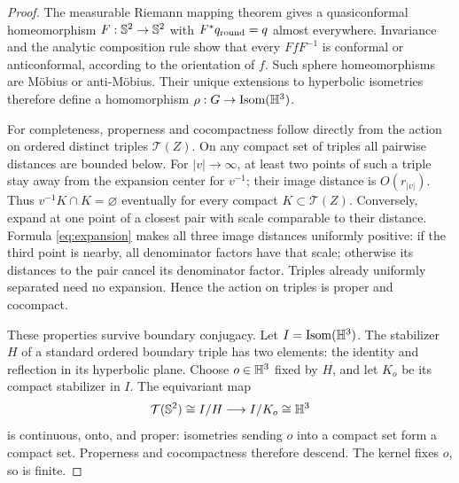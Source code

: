 \begin{proof}
The measurable Riemann mapping theorem
\cite[Theorem 6]{AhlforsBers} gives a quasiconformal
homeomorphism $F:\mathbb S^2\to\mathbb S^2$ with $F^*q_{\rm round}=q$ almost
everywhere. Invariance and the analytic composition rule show that
every $FfF^{-1}$ is conformal or anticonformal, according to the
orientation of $f$. Such sphere homeomorphisms are M\"obius or
anti-M\"obius. Their unique extensions to hyperbolic isometries therefore
define a homomorphism $\rho:G\to\operatorname{Isom}(\mathbb H^3)$.

For completeness, properness and cocompactness follow directly
from the action on ordered distinct triples $\mathcal T(Z)$.
On any compact set of triples all pairwise distances are bounded
below. For $|v|\to\infty$, at least two points of such a triple
stay away from the expansion center for $v^{-1}$; their image
distance is $O(r_{|v|})$. Thus $v^{-1}K\cap K=\varnothing$
eventually for every compact $K\subset\mathcal T(Z)$.
Conversely, expand at one point of a closest pair with scale
comparable to their distance. Formula \eqref{eq:expansion} makes
all three image distances uniformly positive: if the third point
is nearby, all denominator factors have that scale; otherwise
its distances to the pair cancel its denominator factor.
Triples already uniformly separated need no expansion.
Hence the action on triples is proper and cocompact.

These properties survive boundary conjugacy. Let $I=\operatorname{Isom}(\mathbb H^3)$.
The stabilizer $H$ of a standard ordered boundary triple has two
elements: the identity and reflection in its hyperbolic plane.
Choose $o\in\mathbb H^3$ fixed by $H$, and let $K_o$ be its compact
stabilizer in $I$. The equivariant map
\[
 \mathcal T(\mathbb S^2)\cong I/H\longrightarrow I/K_o\cong\mathbb H^3
\]
is continuous, onto, and proper: isometries sending $o$ into a
compact set form a compact set. Properness and cocompactness
therefore descend. The kernel fixes $o$, so is finite.
\end{proof}
